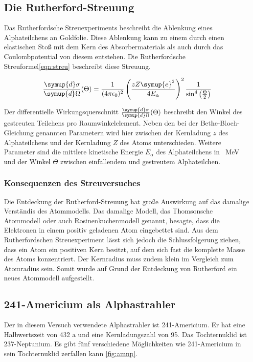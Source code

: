 \subsection{Die Rutherford-Streuung}
Das Rutherfordsche Streuexperiments beschreibt die Ablenkung eines Alphateilchens
an Goldfolie. Diese Ablenkung kann zu einem durch einen elastischen Stoß mit
dem Kern des Absorbermaterials als auch durch das Coulombpotential von diesem
entstehen. Die Rutherfordsche Streuformel\eqref{eqn:streu} beschreibt diese Streuung.

\begin{equation}
  \frac{\symup{d} \sigma}{\symup{d} \Omega} (\Theta) =
  \frac{1}{(4 \pi \epsilon_0)^2} \left(\frac{{z} {Z} \symup{e}^2}
  {4 {E}_\alpha}\right)^2 \frac{1}{\sin^4\left(\frac{\Theta}{2}\right)}
  \label{eqn:streu}
\end{equation}

Der differentielle Wirkungsquerschnitt $\frac{\symup{d} \sigma}{\symup{d} \Omega} (\Theta)$
beschreibt den Winkel des gestreuten Teilchens pro Raumwinkelelement. Neben den
bei der Bethe-Bloch-Gleichung genannten Parametern wird hier zwischen der
Kernladung $z$ des Alphateilchens und der Kernladung $Z$ des Atoms unterschieden.
Weitere Parameter sind die mittlere kinetische Energie ${E}_\alpha$ des
Alphateilchens in \SI{}{\mega\electronvolt} und der Winkel $\Theta$ zwischen
einfallendem und gestreutem Alphateilchen.

\subsubsection{Konsequenzen des Streuversuches}
Die Entdeckung der Rutherford-Streuung hat große Auswirkung auf das damalige
Verständis des Atommodells. Das damalige Modell, das Thomsonsche Atommodell oder
auch Rosinenkuchenmodell genannt, besagte, dass die Elektronen in einem
positiv geladenen Atom eingebettet sind. Aus dem Rutherfordschen Streuexperiment
lässt sich jedoch die Schlussfolgerung ziehen, dass ein Atom ein positiven
Kern besitzt, auf dem sich fast die komplette Masse des Atoms konzentriert. Der
Kernradius muss zudem klein im Vergleich zum Atomradius sein. Somit wurde auf
Grund der Entdeckung von Rutherford ein neues Atommodell aufgestellt.

\subsection{241-Americium als Alphastrahler}
Der in diesem Versuch verwendete Alphastrahler ist 241-Americium. Er hat eine
Halbwertszeit von 432 a und eine Kernladungszahl von 95. Das Tochternuklid
ist 237-Neptunium. Es gibt fünf verschiedene Möglichkeiten wie 241-Americium in
sein Tochternuklid zerfallen kann \ref{fig:amnp}.


